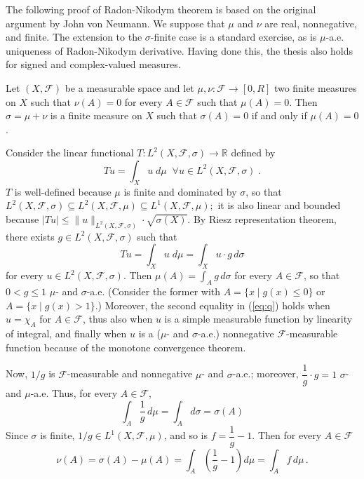 \documentclass[12pt]{article}
\begin{document}
The following proof of Radon-Nikodym theorem
is based on the original argument by John von Neumann.
We suppose that $\mu$ and $\nu$ are real, nonnegative, and finite.
The extension to the $\sigma$-finite case is a standard exercise,
as is $\mu$-a.e. uniqueness of Radon-Nikodym derivative.
Having done this, the thesis also holds for signed and complex-valued measures.

Let $(X,\mathcal{F})$ be a measurable space
and let $\mu,\nu:\mathcal{F}\to[0,R]$ two finite measures on $X$
such that $\nu(A)=0$ for every $A\in\mathcal{F}$ such that $\mu(A)=0$.
Then $\sigma=\mu+\nu$ is a finite measure on $X$
such that $\sigma(A)=0$ if and only if $\mu(A)=0$.

Consider the linear functional
\begin{math}
T:L^2(X,\mathcal{F},\sigma)\to\mathbb{R}
\end{math}
defined by
\begin{equation} \label{eq:T}
Tu=\int_Xu\;d\mu\;\;\forall u\in L^2(X,\mathcal{F},\sigma)\;.
\end{equation}
$T$ is well-defined
because $\mu$ is finite and dominated by $\sigma$, so that
\begin{math}
L^2(X,\mathcal{F},\sigma)
\subseteq L^2(X,\mathcal{F},\mu)
\subseteq L^1(X,\mathcal{F},\mu);
\end{math}
it is also linear and bounded because
\begin{math}
|Tu|\leq\|u\|_{L^2(X,\mathcal{F},\sigma)}\cdot\sqrt{\sigma(X)}.
\end{math}
By Riesz representation theorem, there exists $g\in L^2(X,\mathcal{F},\sigma)$ such that
\begin{equation} \label{eq:g}
Tu=\int_Xu\;d\mu=\int_Xu\cdot g\,d\sigma
\end{equation}
for every $u\in L^2(X,\mathcal{F},\sigma)$.
Then
\begin{math}
\mu(A)=\int_Ag\,d\sigma
\end{math}
for every $A\in\mathcal{F}$,
so that $0<g\leq 1$ $\mu$- and $\sigma$-a.e.
(Consider the former with $A=\{x\mid g(x)\leq 0\}$ or $A=\{x\mid g(x)>1\}$.)
Moreover, the second equality in (\ref{eq:q})
holds when $u=\chi_A$ for $A\in\mathcal{F}$,
thus also when $u$ is a simple measurable function
by linearity of integral,
and finally when $u$ is a ($\mu$- and $\sigma$-a.e.)
nonnegative $\mathcal{F}$-measurable function
because of the monotone convergence theorem.

Now, $1/g$ is $\mathcal{F}$-measurable
and nonnegative $\mu$- and $\sigma$-a.e.;
moreover, $\dfrac{1}{g}\cdot g=1$ $\sigma$- and $\mu$-a.e.
Thus, for every $A\in\mathcal{F}$,
\begin{equation} \label{eq:1/g}
\int_A\frac{1}{g}\,d\mu
=\int_Ad\sigma
=\sigma(A)
\end{equation}
Since $\sigma$ is finite, $1/g\in L^1(X,\mathcal{F},\mu)$,
and so is $f=\dfrac{1}{g}-1$.
Then for every $A\in\mathcal{F}$
\begin{displaymath}
\nu(A)=\sigma(A)-\mu(A)
=\int_A\left(\frac{1}{g}-1\right)d\mu
=\int_Af\,d\mu\,.
\end{displaymath}

\end{document}
